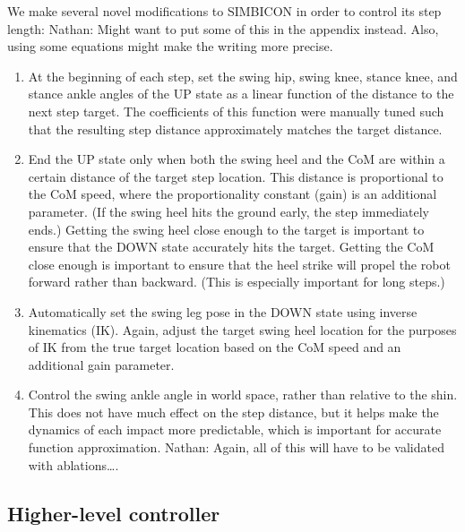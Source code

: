 \documentclass[a4paper]{article}
\newcommand{\nhatch}[1]{{\leavevmode\color{blue} Nathan: #1}}
\begin{document}
We make several novel modifications to SIMBICON in order to control its step length:
\nhatch{Might want to put some of this in the appendix instead. Also, using some equations might make the writing more precise.}
\begin{enumerate}
  \item At the beginning of each step, set the swing hip, swing knee, stance knee, and stance ankle angles of the UP state as a linear function of the distance to the next step target.
    The coefficients of this function were manually tuned such that the resulting step distance approximately matches the target distance.

  \item End the UP state only when both the swing heel and the CoM are within a certain distance of the target step location.
    This distance is proportional to the CoM speed, where the proportionality constant (gain) is an additional parameter.
    (If the swing heel hits the ground early, the step immediately ends.)
    Getting the swing heel close enough to the target is important to ensure that the DOWN state accurately hits the target.
    Getting the CoM close enough is important to ensure that the heel strike will propel the robot forward rather than backward.
    (This is especially important for long steps.)

  \item Automatically set the swing leg pose in the DOWN state using inverse kinematics (IK).
    Again, adjust the target swing heel location for the purposes of IK from the true target location based on the CoM speed and an additional gain parameter.

  \item Control the swing ankle angle in world space, rather than relative to the shin.
    This does not have much effect on the step distance, but it helps make the dynamics of each impact more predictable, which is important for accurate function approximation.
    \nhatch{Again, all of this will have to be validated with ablations\dots.}
\end{enumerate}


\subsection{Higher-level controller}
\end{document}
